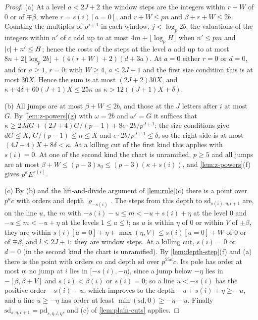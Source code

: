 \begin{proof}
(a) At a level $a<2J+2$ the window steps are the integers within $r+W$ of $0$ or of $\mp\beta$, where $r=s(i)[a=0]$, and $r+W\le pn$ and $\beta+r+W\le2b$. Counting the multiples of $p^{j+1}$ in each window, $j<\log_p2b$, the valuations of the integers within $n'$ of $c$ add up to at most $4m+\lfloor\log_pH\rfloor$ when
$n'\le pm$ and $\lvert c\rvert+n'\le H$; hence the costs of the steps at the level $a$ add up to at most $8n+2\lfloor\log_p2b\rfloor+(4(r+W)+2)(d+3a)$. At $a=0$ either $r=0$ or $d=0$, and for $a\ge1$, $r=0$; with $W\ge4$, $a\le2J+1$ and the first size condition this is at most $30X$. Hence the sum is at most
$(2J+2)30X$, and $\kappa+4\delta+60(J+1)X\le25\kappa$ as $\kappa>12((J+1)X+\delta)$.

(b) All jumps are at most $\beta+W\le2b$, and those at the $J$ letters after $i$ at most $G$. By \cref{lem:z-powers}(g) with $\omega=2b$ and $\omega'=G$ it suffices that $\kappa\ge2JdG+(2J+4)G/(p-1)+8e\cdot2b/p^{J+1}$; the size conditions give $dG\le X$, $G/(p-1)\le n\le X$ and $e\cdot2b/p^{J+1}\le\delta$, so
the right side is at most $(4J+4)X+8\delta<\kappa$. At a killing cut of the first kind this applies with $s(i)=0$. At one of the second kind the chart is unramified, $p\ge5$ and all jumps are at most $\beta+W\le(p-3)s_0\le(p-3)(\kappa+s(i))$, and \cref{lem:z-powers}(f) gives $p^\kappa E^{s(i)}$.

(c) By (b) and the lift-and-divide argument of \cref{lem:rule}(c) there is a point over $p^\kappa c$ with orders and depth $\varrho_{-s(i)}$. The steps from this depth to $\mathrm{sd}_{s(i),\eta,l+1}$ are, on the line $u$, the $m$ with $-s(i)-u\le m<-u+s(i)+\eta$ at the level $0$ and $-u\le m<-u+\eta$ at the levels $1\le a\le l$; as $u$ is
within $\eta$ of $0$ or within $V$ of $\pm\beta$, they are within $s(i)[a=0]+\eta+\max(\eta,V)\le s(i)[a=0]+W$ of $0$ or of $\mp\beta$, and $l\le2J+1$: they are window steps. At a killing cut, $s(i)=0$ or $d=0$ (in the second kind the chart is unramified). By \cref{lem:depth-step}(f) and (a) there is the point
with orders $\mathrm{co}$ and depth $\mathrm{sd}$ over $p^{25\kappa}c$. Its pole has order at most $\eta$: no jump at $i$ lies in $[-s(i),-\eta)$, since a jump below $-\eta$ lies in $-[\beta,\beta+V]$ and $s(i)<\beta(i)$ or $s(i)=0$; so a line $u<-s(i)$ has the positive order $-s(i)-u$, which improves to the depth
$-u+s(i)+\eta\ge-u$, and a line $u\ge-\eta$ has order at least $\min(\mathrm{sd},0)\ge-\eta-u$. Finally $\mathrm{sd}_{s,\eta,l+1}=\mathrm{pd}_{s,\eta,l,\eta}$, and (c) of \cref{lem:plain-cuts} applies.


\end{proof}
